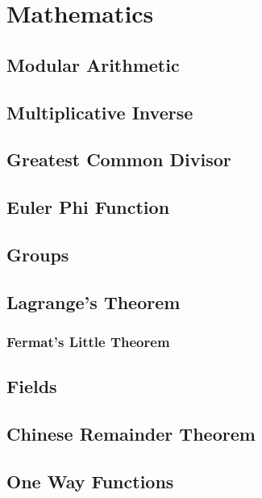 
\chapter{Mathematics}
    \section{Modular Arithmetic}
    
    \section{Multiplicative Inverse}
    
    \section{Greatest Common Divisor}
    
    \section{Euler Phi Function}
    
    \section{Groups}
    
    \section{Lagrange's Theorem}
    
        \subsection{Fermat's Little Theorem}
        
    \section{Fields}
    
    \section{Chinese Remainder Theorem}
    
    \section{One Way Functions}
    
